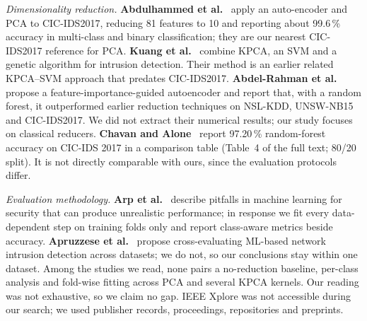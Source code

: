 \documentclass[runningheads]{llncs}
\begin{document}
\textit{Dimensionality reduction.} \textbf{Abdulhammed et al.}~\cite{abdulhammed2019} apply an auto-encoder and PCA to CIC-IDS2017, reducing 81 features to 10 and reporting about 99.6\,\% accuracy in multi-class and binary classification; they are our nearest CIC-IDS2017 reference for PCA. \textbf{Kuang et al.}~\cite{kuang2014} combine KPCA, an SVM and a genetic algorithm for intrusion detection. Their method is an earlier related KPCA--SVM approach that predates CIC-IDS2017. \textbf{Abdel-Rahman et al.}~\cite{abdelrahman2026} propose a feature-importance-guided autoencoder and report that, with a random forest, it outperformed earlier reduction techniques on NSL-KDD, UNSW-NB15 and CIC-IDS2017. We did not extract their numerical results; our study focuses on classical reducers. \textbf{Chavan and Alone}~\cite{chavan2025} report 97.20\,\% random-forest accuracy on CIC-IDS 2017 in a comparison table (Table~4 of the full text; 80/20 split). It is not directly comparable with ours, since the evaluation protocols differ.

\textit{Evaluation methodology.} \textbf{Arp et al.}~\cite{arp2022} describe pitfalls in machine learning for security that can produce unrealistic performance; in response we fit every data-dependent step on training folds only and report class-aware metrics beside accuracy. \textbf{Apruzzese et al.}~\cite{apruzzese2022} propose cross-evaluating ML-based network intrusion detection across datasets; we do not, so our conclusions stay within one dataset. Among the studies we read, none pairs a no-reduction baseline, per-class analysis and fold-wise fitting across PCA and several KPCA kernels. Our reading was not exhaustive, so we claim no gap. IEEE Xplore was not accessible during our search; we used publisher records, proceedings, repositories and preprints.
\end{document}
